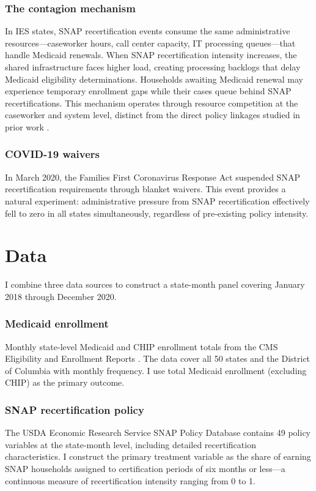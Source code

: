 \documentclass[12pt]{article}
\begin{document}
\subsubsection*{The contagion mechanism} In IES states, SNAP recertification events consume the same administrative resources---caseworker hours, call center capacity, IT processing queues---that handle Medicaid renewals. When SNAP recertification intensity increases, the shared infrastructure faces higher load, creating processing backlogs that delay Medicaid eligibility determinations. Households awaiting Medicaid renewal may experience temporary enrollment gaps while their cases queue behind SNAP recertifications. This mechanism operates through resource competition at the caseworker and system level, distinct from the direct policy linkages studied in prior work \citep{bitler2003, klerman2011}.

\subsubsection*{COVID-19 waivers} In March 2020, the Families First Coronavirus Response Act suspended SNAP recertification requirements through blanket waivers. This event provides a natural experiment: administrative pressure from SNAP recertification effectively fell to zero in all states simultaneously, regardless of pre-existing policy intensity.


\section{Data}

I combine three data sources to construct a state-month panel covering January 2018 through December 2020.

\subsubsection*{Medicaid enrollment} Monthly state-level Medicaid and CHIP enrollment totals from the CMS Eligibility and Enrollment Reports \citep{cms2025}. The data cover all 50 states and the District of Columbia with monthly frequency. I use total Medicaid enrollment (excluding CHIP) as the primary outcome.

\subsubsection*{SNAP recertification policy} The USDA Economic Research Service SNAP Policy Database \citep{usda2024} contains 49 policy variables at the state-month level, including detailed recertification characteristics. I construct the primary treatment variable as the share of earning SNAP households assigned to certification periods of six months or less---a continuous measure of recertification intensity ranging from 0 to 1.
\end{document}
